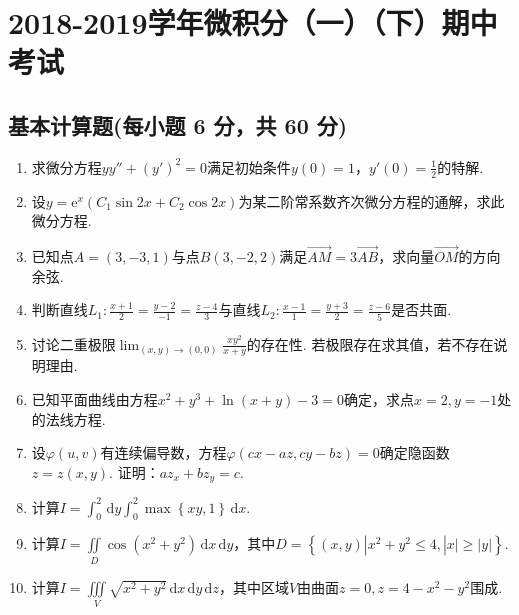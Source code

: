 \documentclass[../main.tex]{subfiles}
\begin{document}
\chapter{2018-2019学年微积分（一）（下）期中考试}

\section{基本计算题(每小题 6 分，共 60 分)}
\begin{enumerate}
    \item 求微分方程$yy''+(y')^{2} = 0$满足初始条件$y(0)=1$，$y'(0)=\frac{1}{2}$的特解.
          \vspace{12em}

    \item 设$y=\mathrm{e}^{x}\left(C_{1}\sin 2x+C_{2}\cos 2x\right)$为某二阶常系数齐次微分方程的通解，求此微分方程.
          \vspace{12em}

    \item 已知点$A=(3,-3,1)$与点$B(3,-2,2)$满足$\overrightarrow{AM}= 3\overrightarrow
              {AB}$，求向量$\overrightarrow{OM}$的方向余弦.
          \vspace{12em}

    \item 判断直线$L_{1}:\frac{x+1}{2}=\frac{y-2}{-1}=\frac{z-4}{3}$与直线$L_{2}:
              \frac{x-1}{1}=\frac{y+3}{2}=\frac{z-6}{5}$是否共面.
          \vspace{13em}

    \item 讨论二重极限$\lim_{(x,y)\to (0,0)}\frac{x y^{2}}{x+y}$的存在性.
          若极限存在求其值，若不存在说明理由.
          \vspace{13em}

    \item 已知平面曲线由方程$x^{2}+y^{3}+\ln(x+y)-3=0$确定，求点$x=2,y=-1$处的法线方程.
          \vspace{14em}

    \item 设$\varphi(u,v)$有连续偏导数，方程$\varphi(cx-az,cy-bz)=0$确定隐函数$z=
              z(x,y)$. 证明：$az_{x}+bz_{y} = c$.
          \vspace{13em}

    \item 计算$I=\int_{0}^{2}\,\mathrm{d}y\int_{0}^{2}\max\left\{xy,1\right\}\,\mathrm{d}
              x$.
          \vspace{12em}

    \item 计算$I=\iint\limits_{D}\cos\left(x^{2}+y^{2}\right)\,\mathrm{d}x\,\mathrm{d}
              y$，其中$D=\left\{(x,y)|x^{2}+y^{2}\leq 4, |x|\geq |y|\right\}$.
          \vspace{12em}

    \item 计算$I=\iiint\limits_{V}\sqrt{x^{2}+y^{2}}\,\mathrm{d}x\,\mathrm{d}y\,\mathrm{d}
              z$，其中区域$V$由曲面$z=0,z=4-x^{2}-y^{2}$围成.
          \vspace{12em}
\end{enumerate}
\end{document}

